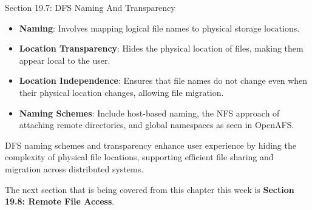 \begin{notes}{Section 19.7: DFS Naming And Transparency}
\begin{highlight}
        \begin{itemize}
            \item \textbf{Naming}: Involves mapping logical file names to physical storage locations.
            \item \textbf{Location Transparency}: Hides the physical location of files, making them appear local to the user.
            \item \textbf{Location Independence}: Ensures that file names do not change even when their physical location changes, allowing file migration.
            \item \textbf{Naming Schemes}: Include host-based naming, the NFS approach of attaching remote directories, and global namespaces as seen in OpenAFS.
        \end{itemize}
    
    DFS naming schemes and transparency enhance user experience by hiding the complexity of physical file locations, supporting efficient file sharing and migration across distributed systems.
    
    \end{highlight}
\end{notes}

The next section that is being covered from this chapter this week is \textbf{Section 19.8: Remote File Access}.


